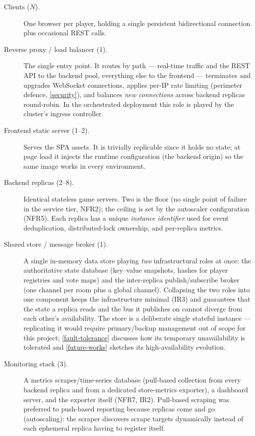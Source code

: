 \documentclass{scrartcl}
\begin{document}
\begin{description}
  \item[Clients ($N$).] One browser per player, holding a single persistent
  bidirectional connection plus occasional REST calls.

  \item[Reverse proxy / load balancer (1).] The single entry point. It
  routes by path --- real-time traffic and the REST API to the backend pool,
  everything else to the frontend --- terminates and upgrades WebSocket
  connections, applies per-IP rate limiting (perimeter defence,
  \cref{security}), and balances \emph{new connections} across backend
  replicas round-robin. In the orchestrated deployment this role is played
  by the cluster's ingress controller.

  \item[Frontend static server (1--2).] Serves the SPA assets. It is
  trivially replicable since it holds no state; at page load it injects
  the runtime configuration (the backend origin) so the same image works
  in every environment.

  \item[Backend replicas (2--8).] Identical stateless game servers. Two is
  the floor (no single point of failure in the service tier, NFR2); the
  ceiling is set by the autoscaler configuration (NFR5). Each replica has
  a unique \emph{instance identifier} used for event deduplication,
  distributed-lock ownership, and per-replica metrics.

  \item[Shared store / message broker (1).] A single in-memory data store
  playing \emph{two} infrastructural roles at once: the authoritative
  state database (key--value snapshots, hashes for player registries and
  vote maps) and the inter-replica publish/subscribe broker (one channel
  per room plus a global channel). Collapsing the two roles into one
  component keeps the infrastructure minimal (IR3) and guarantees that
  the state a replica reads and the bus it publishes on cannot diverge
  from each other's availability. The store is a deliberate single
  stateful instance --- replicating it would require primary/backup
  management out of scope for this project; \cref{fault-tolerance}
  discusses how its temporary unavailability is tolerated and
  \cref{future-works} sketches its high-availability evolution.

  \item[Monitoring stack (3).] A metrics scraper/time-series database
  (pull-based collection from every backend replica and from a dedicated
  store-metrics exporter), a dashboard server, and the exporter itself
  (NFR7, IR2). Pull-based scraping was preferred to push-based reporting
  because replicas come and go (autoscaling): the scraper discovers
  scrape targets dynamically instead of each ephemeral replica having to
  register itself.
\end{description}
\end{document}
